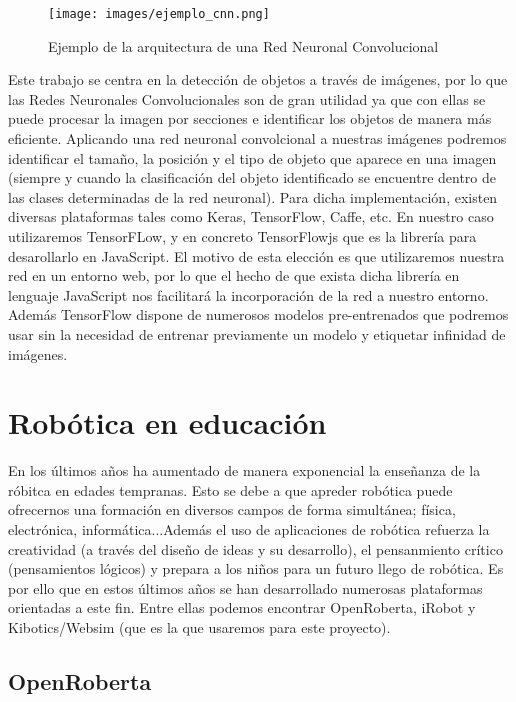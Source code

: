 \documentclass{report}
\begin{document}
\begin{figure}[h]
	\centering
	 \texttt{[image: images/ejemplo\_cnn.png]}
	 \caption{Ejemplo de la arquitectura de una Red Neuronal Convolucional}
\end{figure}

Este trabajo se centra en la detección de objetos a través de imágenes, por lo que las Redes Neuronales Convolucionales son de gran utilidad ya que con ellas se puede procesar la imagen por secciones e identificar los objetos de manera más eficiente. Aplicando una red neuronal convolcional a nuestras imágenes podremos identificar el tamaño, la posición y el tipo de objeto que aparece en una imagen (siempre y cuando la clasificación del objeto identificado se encuentre dentro de las clases determinadas de la red neuronal). Para dicha implementación, existen diversas plataformas tales como Keras, TensorFlow, Caffe, etc. En nuestro caso utilizaremos TensorFLow, y en concreto TensorFlowjs que es la librería para desarollarlo en JavaScript. El motivo de esta elección es que utilizaremos nuestra red en un entorno web, por lo que el hecho de que exista dicha librería en lenguaje JavaScript nos facilitará la incorporación de la red a nuestro entorno. Además TensorFlow dispone de numerosos modelos pre-entrenados que podremos usar sin la necesidad de entrenar previamente un modelo y etiquetar infinidad de imágenes.

\section{Robótica en educación}

En los últimos años ha aumentado de manera exponencial la enseñanza de la róbitca en edades tempranas. Esto se debe a que apreder robótica puede ofrecernos una formación en diversos campos de forma simultánea; física, electrónica, informática...Además el uso de aplicaciones de robótica refuerza la creatividad (a través del diseño de ideas y su desarrollo), el pensanmiento crítico (pensamientos lógicos) y prepara a los niños para un futuro llego de robótica. Es por ello que en estos últimos años se han desarrollado numerosas plataformas orientadas a este fin. Entre ellas podemos encontrar OpenRoberta, iRobot y Kibotics/Websim (que es la que usaremos para este proyecto).

\subsection{OpenRoberta}
\end{document}

